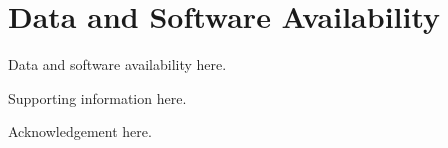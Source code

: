 \documentclass[journal=jctcce,manuscript=article]{achemso} %
\begin{document}
\section*{Data and Software Availability}
Data and software availability here.

\begin{suppinfo}
Supporting information here.
\end{suppinfo}

\begin{acknowledgement}
Acknowledgement here.
\end{acknowledgement}


\end{document}
